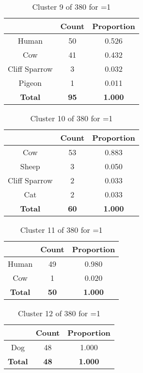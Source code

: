 \begin{table}[ht!]
\centering
\begin{tabular}{|c|c|c|}
\hline
\bf \Spec{} &\bf Count &\bf Proportion\\ \hline \hline
Human & 50 & 0.526\\ \hline
Cow & 41 & 0.432\\ \hline
Cliff Sparrow & 3 & 0.032\\ \hline
Pigeon & 1 & 0.011\\ \hline
\hline
\bf Total & \bf 95 & \bf 1.000\\ \hline
\end{tabular}
\label{tab:cluster:9:1}
\caption{Cluster 9 of 380 for \minneigh{}=1}
\end{table}

\clearpage
\begin{table}[ht!]
\centering
\begin{tabular}{|c|c|c|}
\hline
\bf \Spec{} &\bf Count &\bf Proportion\\ \hline \hline
Cow & 53 & 0.883\\ \hline
Sheep & 3 & 0.050\\ \hline
Cliff Sparrow & 2 & 0.033\\ \hline
Cat & 2 & 0.033\\ \hline
\hline
\bf Total & \bf 60 & \bf 1.000\\ \hline
\end{tabular}
\label{tab:cluster:10:1}
\caption{Cluster 10 of 380 for \minneigh{}=1}
\end{table}

\begin{table}[ht!]
\centering
\begin{tabular}{|c|c|c|}
\hline
\bf \Spec{} &\bf Count &\bf Proportion\\ \hline \hline
Human & 49 & 0.980\\ \hline
Cow & 1 & 0.020\\ \hline
\hline
\bf Total & \bf 50 & \bf 1.000\\ \hline
\end{tabular}
\label{tab:cluster:11:1}
\caption{Cluster 11 of 380 for \minneigh{}=1}
\end{table}

\begin{table}[ht!]
\centering
\begin{tabular}{|c|c|c|}
\hline
\bf \Spec{} &\bf Count &\bf Proportion\\ \hline \hline
Dog & 48 & 1.000\\ \hline
\hline
\bf Total & \bf 48 & \bf 1.000\\ \hline
\end{tabular}
\label{tab:cluster:12:1}
\caption{Cluster 12 of 380 for \minneigh{}=1}
\end{table}

